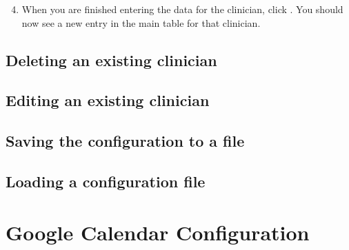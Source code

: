 \documentclass[letterpaper,10pt,english]{sphinxmanual}
\begin{document}
\begin{figure}[htbp]
\centering
{}\end{figure}

\begin{DUlineblock}{0em}
\item[] 
\end{DUlineblock}
\begin{enumerate}
\setcounter{enumi}{3}
\item {} 
When you are finished entering the data for the clinician, click .
You should now see a new entry in the main table for that clinician.

\end{enumerate}

\begin{figure}[htbp]
\centering
{}\end{figure}

\begin{DUlineblock}{0em}
\item[] 
\end{DUlineblock}


\subsection{Deleting an existing clinician}
\label{\detokenize{index:deleting-an-existing-clinician}}

\subsection{Editing an existing clinician}
\label{\detokenize{index:editing-an-existing-clinician}}

\subsection{Saving the configuration to a file}
\label{\detokenize{index:saving-the-configuration-to-a-file}}

\subsection{Loading a configuration file}
\label{\detokenize{index:loading-a-configuration-file}}

\section{Google Calendar Configuration}
\label{\detokenize{index:google-calendar-configuration}}
\end{document}
